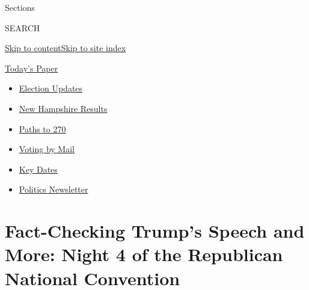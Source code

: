 Sections

SEARCH

\protect\hyperlink{site-content}{Skip to
content}\protect\hyperlink{site-index}{Skip to site index}

\href{https://myaccount.nytimes3xbfgragh.onion/auth/login?response_type=cookie\&client_id=vi}{}

\href{https://www.nytimes3xbfgragh.onion/section/todayspaper}{Today's
Paper}

\begin{itemize}
\item
  \href{https://www.nytimes3xbfgragh.onion/live/2020/09/09/us/trump-vs-biden?action=click\&pgtype=Article\&state=default\&region=TOP_BANNER\&context=storylines_menu}{Election
  Updates}
\item
  \href{https://www.nytimes3xbfgragh.onion/interactive/2020/09/08/us/elections/results-new-hampshire-primary-elections.html?action=click\&pgtype=Article\&state=default\&region=TOP_BANNER\&context=storylines_menu}{New
  Hampshire Results}
\item
  \href{https://www.nytimes3xbfgragh.onion/interactive/2020/us/elections/election-states-biden-trump.html?action=click\&pgtype=Article\&state=default\&region=TOP_BANNER\&context=storylines_menu}{Paths
  to 270}
\item
  \href{https://www.nytimes3xbfgragh.onion/interactive/2020/08/31/us/politics/vote-by-mail-deadlines.html?action=click\&pgtype=Article\&state=default\&region=TOP_BANNER\&context=storylines_menu}{Voting
  by Mail}
\item
  \href{https://www.nytimes3xbfgragh.onion/interactive/2019/us/elections/2020-presidential-election-calendar.html?action=click\&pgtype=Article\&state=default\&region=TOP_BANNER\&context=storylines_menu}{Key
  Dates}
\item
  \href{https://www.nytimes3xbfgragh.onion/newsletters/politics?action=click\&pgtype=Article\&state=default\&region=TOP_BANNER\&context=storylines_menu}{Politics
  Newsletter}
\end{itemize}

\hypertarget{fact-checking-trumps-speech-and-more-night-4-of-the-republican-national-convention}{%
\section{Fact-Checking Trump's Speech and More: Night 4 of the
Republican National
Convention}\label{fact-checking-trumps-speech-and-more-night-4-of-the-republican-national-convention}}

